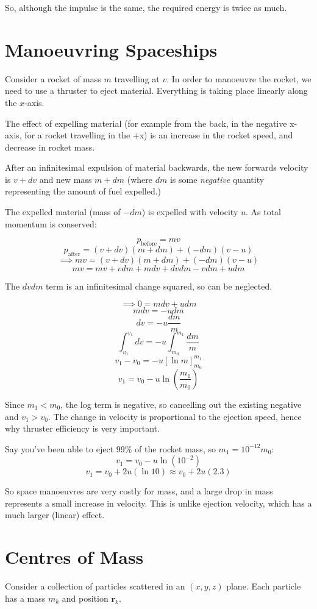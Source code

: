 So, although the impulse is the same, the required energy is twice as much.

\section{Manoeuvring Spaceships}

Consider a rocket of mass $m$ travelling at $v$. In order to manoeuvre the rocket, we need to use a thruster to eject material. Everything is taking place linearly along the $x$-axis.

The effect of expelling material (for example from the back, in the negative x-axis, for a rocket travelling in the +x) is an increase in the rocket speed, and decrease in rocket mass.

After an infinitesimal expulsion of material backwards, the new forwards velocity is $v + dv$ and new mass $m + dm$ (where $dm$ is some \emph{negative} quantity representing the amount of fuel expelled.)

The expelled material (mass of $-dm$) is expelled with velocity $u$. As total momentum is conserved:

\[
    p_\text{before} = mv
\]
\[
    p_\text{after} = (v+dv)(m+dm) + (-dm)(v-u)
\]
\[
    \implies mv = (v+dv)(m+dm) + (-dm)(v-u)
\]
\[
    mv = mv + vdm + mdv + dvdm -vdm + udm
\]

The $dv dm$ term is an infinitesimal change squared, so can be neglected.

\[
    \implies 0 = m dv + u dm
\]
\[
    mdv = - udm
\]
\[
    dv = -u \frac{dm}{m}
\]
\[
    \int_{v_0}^{v_1} dv = -u \int_{m_0}^{m_1} \frac{dm}{m}
\]
\[
    v_1 - v_0 = -u \left[\ln m\right]^{m_1}_{m_0}
\]
\[
    v_1 = v_0 - u \ln \left(\frac{m_1}{m_0}\right)
\]

Since $m_1 < m_0$, the log term is negative, so cancelling out the existing negative and $v_1 > v_0$. The change in velocity is proportional to the ejection speed, hence why thruster efficiency is very important.

Say you've been able to eject $99\%$ of the rocket mass, so $m_1 = 10^{-12}m_0$:
\[
    v_1 = v_0 - u \ln(10^{-2})
\]
\[
    v_1 = v_0 + 2u(\ln 10) \approx v_0 + 2u(2.3)
\]

So space manoeuvres are very costly for mass, and a large drop in mass represents a small increase in velocity. This is unlike ejection velocity, which has a much larger (linear) effect.

\section{Centres of Mass}
Consider a collection of particles scattered in an $(x, y, z)$ plane. Each particle has a mass $m_k$ and position $\pmb{r}_k$.

